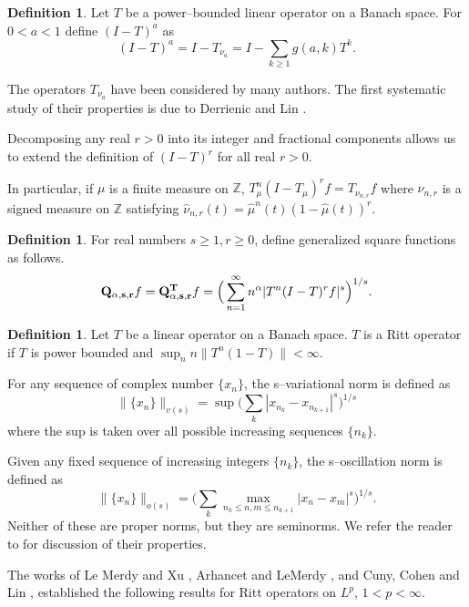 \documentclass[11pt]{amsart}
\theoremstyle{definition}
\newtheorem{defn}[thm]{Definition} %
\theoremstyle{remark}
\begin{document}
\begin{defn} %
Let $T$ be a power--bounded linear operator on a Banach space. For $0<a<1$ define $(I-T)^{a}$ 
as \[(I-T)^{a} = I - T_{\nu_{a}}= I - \sum_{k\ge 1} g(a,k) T^k.\]
\end{defn}

The operators $T_{\nu_{a}}$ have been considered by many authors. The first systematic study of their  properties  is due to Derrienic and Lin \cite{DerLin}.  

Decomposing any real $r>0$ into its integer and fractional components allows us to extend the definition of $(I-T)^r$ for all real $r>0$.

In particular, if $\mu$ is a finite measure on $\mathbb Z$,
$T_{\mu}^n(I-T_{\mu})^r f = T_{\nu_{n,r}} f$
where $\nu_{n,r}$ is a signed measure on $\mathbb Z$ satisfying $\hat \nu_{n,r}(t) = \hat \mu^n(t) (1-\hat\mu(t))^r$.



\begin{defn} %
For real numbers $s\ge 1,r\ge 0$, define generalized square functions as follows.
\[{\bf Q_{\alpha,s,r}}f ={\bf Q^{T}_{\alpha,s,r}}f = \Big(\sum_{n=1}^{\infty} n^{\alpha} |T^n(I-T)^r f|^{s} \Big)^{1/s}.\]
\end{defn}


\begin{defn} %
Let $T$ be a linear operator on a Banach space. $T$ is a Ritt operator if $T$ is power bounded and $\sup_n n \lVert T^n(1-T)\rVert<\infty$.
\end{defn}


For any sequence of complex number $\{x_n\}$, the s--variational norm is defined as
\[\lVert \{x_n\} \rVert_{v(s)} = \sup \Big(\sum_k |x_{n_k} - x_{n_{k+1}}|^s \Big)^{1/s}\]
where the sup is taken over all possible increasing sequences $\{n_k\}$.

Given any fixed sequence of increasing integers $\{n_k\}$, the s--oscillation norm is defined as
\[\lVert \{x_n\} \rVert_{o(s)} =\Big(\sum_k \max_{n_k\le n,m\le n_{k+1}} |x_n-x_m|^s \Big)^{1/s}.\]
Neither of these are proper norms, but they are seminorms. We refer the reader to \cite{JKRW,JSW} for discussion of their properties.

 The works of 
Le Merdy and Xu \cite{LeMX-Vq}, Arhancet and LeMerdy \cite{ALeM}, and Cuny, Cohen and Lin \cite{CCL}, established the following results for Ritt operators on $L^p$, $1<p<\infty$. 
\end{document}
